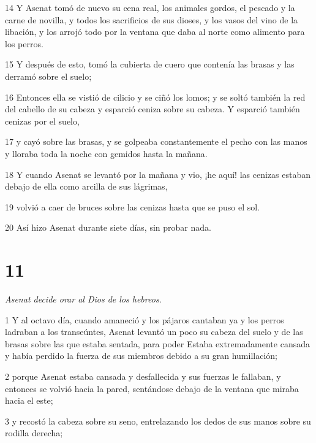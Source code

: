 \par 14 Y Asenat tomó de nuevo su cena real, los animales gordos, el pescado y la carne de novilla, y todos los sacrificios de sus dioses, y los vasos del vino de la libación, y los arrojó todo por la ventana que daba al norte como alimento para los perros.

\par 15 Y después de esto, tomó la cubierta de cuero que contenía las brasas y las derramó sobre el suelo;

\par 16 Entonces ella se vistió de cilicio y se ciñó los lomos; y se soltó también la red del cabello de su cabeza y esparció ceniza sobre su cabeza. Y esparció también cenizas por el suelo,

\par 17 y cayó sobre las brasas, y se golpeaba constantemente el pecho con las manos y lloraba toda la noche con gemidos hasta la mañana.

\par 18 Y cuando Asenat se levantó por la mañana y vio, ¡he aquí! las cenizas estaban debajo de ella como arcilla de sus lágrimas,

\par 19 volvió a caer de bruces sobre las cenizas hasta que se puso el sol.

\par 20 Así hizo Asenat durante siete días, sin probar nada.

\chapter{11}

\par \textit{Asenat decide orar al Dios de los hebreos.}

\par 1 Y al octavo día, cuando amaneció y los pájaros cantaban ya y los perros ladraban a los transeúntes, Asenat levantó un poco su cabeza del suelo y de las brasas sobre las que estaba sentada, para poder Estaba extremadamente cansada y había perdido la fuerza de sus miembros debido a su gran humillación;

\par 2 porque Asenat estaba cansada y desfallecida y sus fuerzas le fallaban, y entonces se volvió hacia la pared, sentándose debajo de la ventana que miraba hacia el este;

\par 3 y recostó la cabeza sobre su seno, entrelazando los dedos de sus manos sobre su rodilla derecha;

